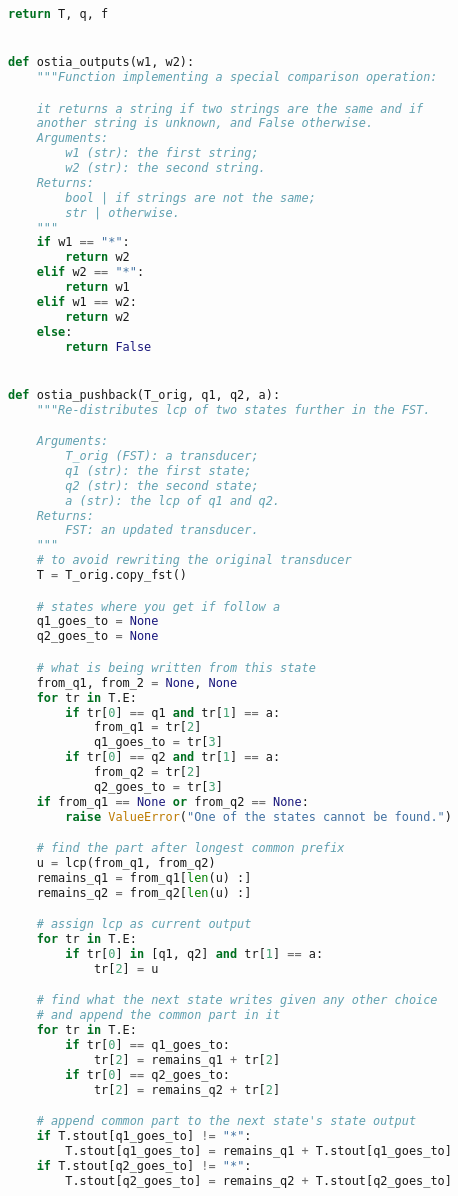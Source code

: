 \begin{lstlisting}[language=Python]
    return T, q, f


def ostia_outputs(w1, w2):
    """Function implementing a special comparison operation:

    it returns a string if two strings are the same and if
    another string is unknown, and False otherwise.
    Arguments:
        w1 (str): the first string;
        w2 (str): the second string.
    Returns:
        bool | if strings are not the same;
        str | otherwise.
    """
    if w1 == "*":
        return w2
    elif w2 == "*":
        return w1
    elif w1 == w2:
        return w2
    else:
        return False


def ostia_pushback(T_orig, q1, q2, a):
    """Re-distributes lcp of two states further in the FST.

    Arguments:
        T_orig (FST): a transducer;
        q1 (str): the first state;
        q2 (str): the second state;
        a (str): the lcp of q1 and q2.
    Returns:
        FST: an updated transducer.
    """
    # to avoid rewriting the original transducer
    T = T_orig.copy_fst()

    # states where you get if follow a
    q1_goes_to = None
    q2_goes_to = None

    # what is being written from this state
    from_q1, from_2 = None, None
    for tr in T.E:
        if tr[0] == q1 and tr[1] == a:
            from_q1 = tr[2]
            q1_goes_to = tr[3]
        if tr[0] == q2 and tr[1] == a:
            from_q2 = tr[2]
            q2_goes_to = tr[3]
    if from_q1 == None or from_q2 == None:
        raise ValueError("One of the states cannot be found.")

    # find the part after longest common prefix
    u = lcp(from_q1, from_q2)
    remains_q1 = from_q1[len(u) :]
    remains_q2 = from_q2[len(u) :]

    # assign lcp as current output
    for tr in T.E:
        if tr[0] in [q1, q2] and tr[1] == a:
            tr[2] = u

    # find what the next state writes given any other choice
    # and append the common part in it
    for tr in T.E:
        if tr[0] == q1_goes_to:
            tr[2] = remains_q1 + tr[2]
        if tr[0] == q2_goes_to:
            tr[2] = remains_q2 + tr[2]

    # append common part to the next state's state output
    if T.stout[q1_goes_to] != "*":
        T.stout[q1_goes_to] = remains_q1 + T.stout[q1_goes_to]
    if T.stout[q2_goes_to] != "*":
        T.stout[q2_goes_to] = remains_q2 + T.stout[q2_goes_to]


\end{lstlisting}
